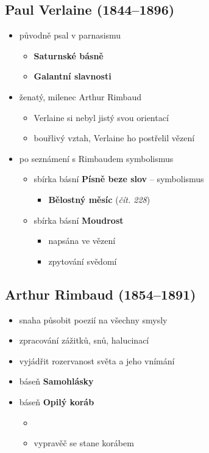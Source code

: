 \subsection{Paul Verlaine (1844--1896)}
\begin{itemize}
\item původně psal v parnasismu
	\begin{itemize}
	\item \textbf{Saturnské básně}
	\item \textbf{Galantní slavnosti}
	\end{itemize}
\item ženatý, milenec Arthur Rimbaud
	\begin{itemize}
	\item Verlaine si nebyl jistý svou orientací
	\item bouřlivý vztah, Verlaine ho postřelil \ra vězení
	\end{itemize}
\item po seznámení s Rimbaudem symbolismus
	\begin{itemize}
	\item sbírka básní \textbf{Písně beze slov} -- symbolismus
		\begin{itemize}
		\item \textbf{Bělostný měsíc} (\textit{čít. 228})
		\end{itemize}
	\item sbírka básní \textbf{Moudrost}
		\begin{itemize}
		\item napsána ve vězení
		\item zpytování svědomí 
		\end{itemize}
	\end{itemize}
\end{itemize}

\subsection{Arthur Rimbaud (1854--1891)}
\begin{itemize}
\item snaha působit poezií na všechny smysly
\item zpracování zážitků, snů, halucinací
\item vyjádřit rozervanost světa a jeho vnímání
\item báseň \textbf{Samohlásky}
\item báseň \textbf{Opilý koráb}
	\begin{itemize}
	\item 
	\item vypravěč se stane korábem
	\end{itemize}
\end{itemize}


